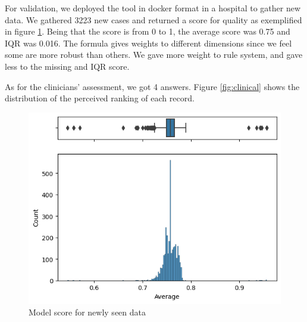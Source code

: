 For validation, we deployed the tool in docker format in a hospital to gather new data. We gathered 3223 new cases and returned a score for quality as exemplified in figure \ref{fig:scores}. Being that the score is from 0 to 1, the average score was 0.75 and IQR was 0.016. The formula gives weights to different dimensions since we feel some are more robust than others. We gave more weight to rule system, and gave less to the missing and IQR score.

As for the clinicians' assessment, we got 4 answers. Figure \ref{fig:clinical} shows the distribution of the perceived ranking of each record.




\begin{figure}[htbp]
\centering
\caption{Model score for newly seen data}\label{fig:scores} 
\includegraphics[scale=0.78]{imgs/Scoring_V2.png}
\end{figure}

